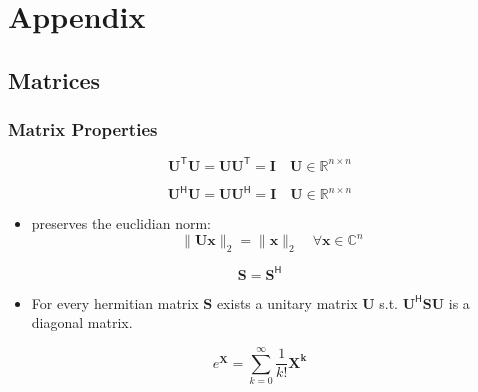 \section{Appendix}
\subsection{Matrices}
\subsubsection{Matrix Properties}\label{app:mat_prop}

\noindent\begin{equation*}
    \mathbf{U}^{\mathsf{T}}\mathbf{U}=\mathbf{UU}^{\mathsf{T}}=\mathbf{I}\quad \mathbf{U}\in \mathbb{R}^{n\times n}
\end{equation*}

\noindent\begin{equation*}
    \mathbf{U}^{\mathsf{H}}\mathbf{U}=\mathbf{UU}^{\mathsf{H}}=\mathbf{I}\quad \mathbf{U}\in \mathbb{R}^{n\times n}
\end{equation*}
\begin{itemize}
    \item preserves the euclidian norm:
          \noindent\begin{equation*}
              \|\mathbf{Ux}\| _2=\|\mathbf{x}\|_2 \quad \forall \mathbf{x} \in \mathbb{C}^n
          \end{equation*}
\end{itemize}

\noindent\begin{equation*}
    \mathbf{S}=\mathbf{S}^{\mathsf{H}}
\end{equation*}
\begin{itemize}
    \item For every hermitian matrix $\mathbf{S}$ exists a unitary matrix $\mathbf{U}$ s.t. $\mathbf{U}^{\mathsf{H}}\mathbf{SU}$ is a diagonal matrix.
\end{itemize}

\newpar{}
\begin{equation*}
    e^{\mathbf{X}} = \sum_{k=0}^{\infty}\frac{1}{k!}\mathbf{X^k}
\end{equation*}


